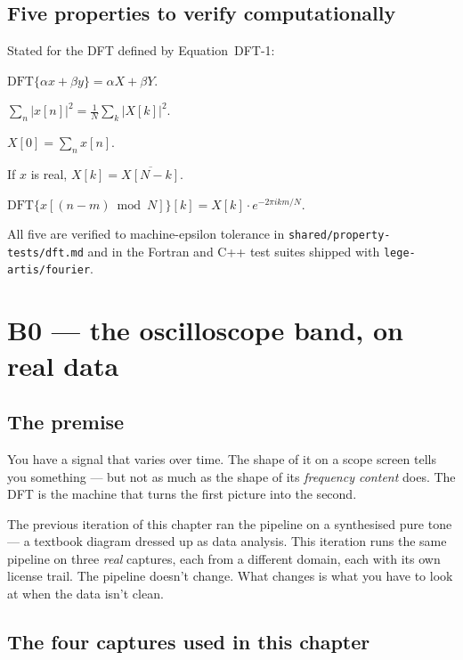 \documentclass[11pt,a4paper,openany]{book}
\begin{document}
\section{Five properties to verify computationally}

Stated for the DFT defined by Equation~DFT-1:
\begin{description}[leftmargin=*]
\item[P1 Linearity.] $\mathrm{DFT}\{\alpha x + \beta y\} = \alpha X + \beta Y$.
\item[P2 Plancherel.] $\sum_n |x[n]|^2 = \tfrac{1}{N}\sum_k |X[k]|^2$.
\item[P3 DC bin.] $X[0] = \sum_n x[n]$.
\item[P4 Hermitian symmetry.] If $x$ is real, $X[k] = \overline{X[N-k]}$.
\item[P5 Time shift.] $\mathrm{DFT}\{x[(n-m) \bmod N]\}[k] = X[k] \cdot e^{-2\pi i k m / N}$.
\end{description}
All five are verified to machine-epsilon tolerance in
\texttt{shared/property-tests/dft.md} and in the Fortran and C++ test
suites shipped with \texttt{lege-artis/fourier}.

\renewcommand{\thechapter}{\arabic{chapter}}
\setcounter{chapter}{-1}
\chapter{B0 --- the oscilloscope band, on real data}
\label{ch:b0}

\section{The premise}

You have a signal that varies over time. The shape of it on a scope
screen tells you something --- but not as much as the shape of its
\emph{frequency content} does. The DFT is the machine that turns the
first picture into the second.

The previous iteration of this chapter ran the pipeline on a
synthesised pure tone --- a textbook diagram dressed up as data
analysis. This iteration runs the same pipeline on three \emph{real}
captures, each from a different domain, each with its own license
trail. The pipeline doesn't change. What changes is what you have to
look at when the data isn't clean.

\section{The four captures used in this chapter}
\end{document}
